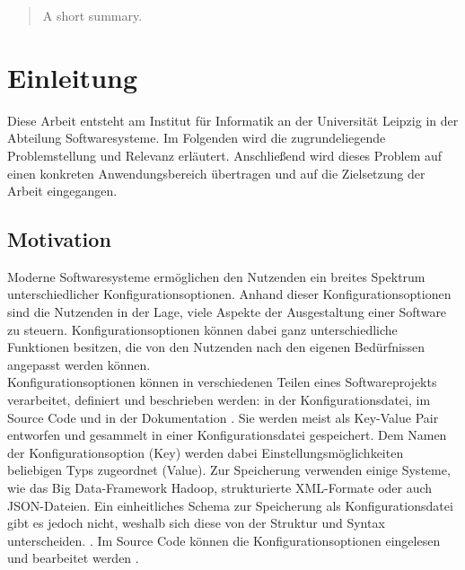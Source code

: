 \documentclass[german,bachelor]{swsLeipzig}
\begin{document}
\begin{frontmatter}
  \begin{abstract}
    A short summary.
  \end{abstract}

  \tableofcontents





\end{frontmatter}

\chapter{Einleitung}\label{Einleitung}
Diese Arbeit entsteht am Institut für Informatik an der Universit\"at Leipzig in der Abteilung \glqq Softwaresysteme\grqq.
Im Folgenden wird die zugrundeliegende Problemstellung und Relevanz erl\"autert.
Anschlie\ss end wird dieses Problem auf einen konkreten Anwendungsbereich \"ubertragen und auf die Zielsetzung der Arbeit eingegangen.\\

\section{Motivation}
Moderne Softwaresysteme erm\"oglichen den Nutzenden ein breites Spektrum unterschiedlicher Konfigurationsoptionen.
Anhand dieser Konfigurationsoptionen sind die Nutzenden in der Lage, viele Aspekte der Ausgestaltung einer Software zu steuern.
Konfigurationsoptionen k\"onnen dabei ganz unterschiedliche Funktionen besitzen, die von den Nutzenden nach den eigenen Bed\"urfnissen angepasst werden k\"onnen.\\

Konfigurationsoptionen können in verschiedenen Teilen eines Softwareprojekts verarbeitet, definiert und beschrieben werden:
in der Konfigurationsdatei, im Source Code und in der Dokumentation \cite[S. 185]{7774519}.
Sie werden meist als Key-Value Pair entworfen und gesammelt in einer Konfigurationsdatei gespeichert.
Dem Namen der Konfigurationsoption (Key) werden dabei Einstellungsmöglichkeiten beliebigen Typs zugeordnet (Value).
Zur Speicherung verwenden einige Systeme, wie das Big Data-Framework Hadoop, strukturierte XML-Formate oder auch JSON-Dateien.
Ein einheitliches Schema zur Speicherung als Konfigurationsdatei gibt es jedoch nicht, weshalb sich diese von der Struktur und Syntax unterscheiden. \cite[S. 131]{10.1145/1985793.1985812}.
Im Source Code können die Konfigurationsoptionen eingelesen und bearbeitet werden \cite[S. 185]{7774519}.\\
\end{document}
